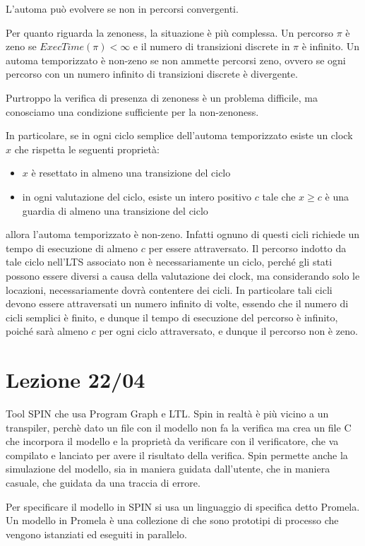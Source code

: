 L'automa può evolvere se non in percorsi convergenti.

Per quanto riguarda la zenoness, la situazione è più complessa. Un percorso \(\pi\) è zeno se \(ExecTime(\pi)<\infty\) e il numero di transizioni discrete in \(\pi\) è infinito. Un automa temporizzato è non-zeno se non ammette percorsi zeno, ovvero se ogni percorso con un numero infinito di transizioni discrete è divergente.

Purtroppo la verifica di presenza di zenoness è un problema difficile, ma conosciamo una condizione sufficiente per la non-zenoness.

In particolare, se in ogni ciclo semplice dell'automa temporizzato esiste un clock \(x\) che rispetta le seguenti proprietà:
\begin{itemize}
  \item \(x\) è resettato in almeno una transizione del ciclo
  \item in ogni valutazione del ciclo, esiste un intero positivo \(c\) tale che \(x \geq c\) è una guardia di almeno una transizione del ciclo
\end{itemize}
allora l'automa temporizzato è non-zeno. Infatti ognuno di questi cicli richiede un tempo di esecuzione di almeno \(c\) per essere attraversato. Il percorso indotto da tale ciclo nell'LTS associato non è necessariamente un ciclo, perché gli stati possono essere diversi a causa della valutazione dei clock, ma considerando solo le locazioni, necessariamente dovrà contentere dei cicli. In particolare tali cicli devono essere attraversati un numero infinito di volte, essendo che il numero di cicli semplici è finito, e dunque il tempo di esecuzione del percorso è infinito, poiché sarà almeno \(c\) per ogni ciclo attraversato, e dunque il percorso non è zeno.

\chapter{Lezione 22/04}

Tool SPIN che usa Program Graph e LTL. Spin in realtà è più vicino a un transpiler, perchè dato un file con il modello non fa la verifica ma crea un file C che incorpora il modello e la proprietà da verificare con il verificatore, che va compilato e lanciato per avere il risultato della verifica. Spin permette anche la simulazione del modello, sia in maniera guidata dall'utente, che in maniera casuale, che guidata da una traccia di errore.

Per specificare il modello in SPIN si usa un linguaggio di specifica detto Promela. Un modello in Promela è una collezione di  che sono prototipi di processo che vengono istanziati ed eseguiti in parallelo.

